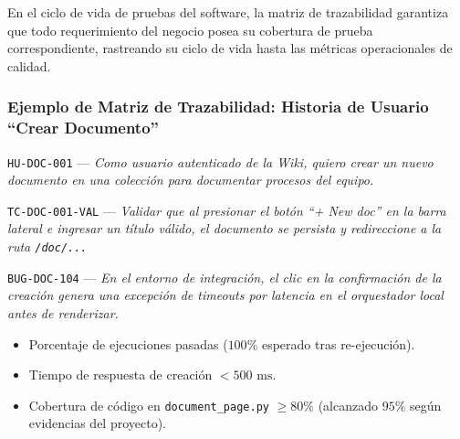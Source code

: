 \documentclass[12pt, letterpaper]{article}
\begin{document}
En el ciclo de vida de pruebas del software, la matriz de trazabilidad garantiza que todo requerimiento del negocio posea su cobertura de prueba correspondiente, rastreando su ciclo de vida hasta las métricas operacionales de calidad.

\subsubsection{Ejemplo de Matriz de Trazabilidad: Historia de Usuario \enquote{Crear Documento}}

\begin{description}[font=\bfseries\color{blue!70!black}]
    \item[Requisito (Historia de Usuario):] \texttt{HU-DOC-001} --- \textit{Como usuario autenticado de la Wiki, quiero crear un nuevo documento en una colección para documentar procesos del equipo.}
    \item[Caso de Prueba (Test Case):] \texttt{TC-DOC-001-VAL} --- \textit{Validar que al presionar el botón \enquote{+ New doc} en la barra lateral e ingresar un título válido, el documento se persista y redireccione a la ruta \texttt{/doc/...}}
    \item[Defecto (Bug Report):] \texttt{BUG-DOC-104} --- \textit{En el entorno de integración, el clic en la confirmación de la creación genera una excepción de timeouts por latencia en el orquestador local antes de renderizar.}
    \item[Métricas de Calidad:]
    \begin{itemize}[leftmargin=*, noitemsep]
        \item Porcentaje de ejecuciones pasadas ($100\%$ esperado tras re-ejecución).
        \item Tiempo de respuesta de creación $< 500\text{ ms}$.
        \item Cobertura de código en \texttt{document\_page.py} $\ge 80\%$ (alcanzado $95\%$ según evidencias del proyecto).
    \end{itemize}
\end{description}

\vspace{0.3cm}
\end{document}
